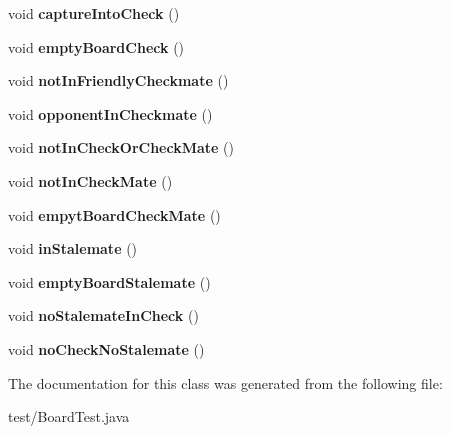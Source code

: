 \begin{DoxyCompactItemize}
\item 
\hypertarget{classtest_1_1BoardTest_aac0671a1d28175f82fe7ebd8a7834ec2}{void {\bfseries capture\-Into\-Check} ()}\label{classtest_1_1BoardTest_aac0671a1d28175f82fe7ebd8a7834ec2}

\item 
\hypertarget{classtest_1_1BoardTest_ab854addb0a5a79e2a1521f0b4e39ac0c}{void {\bfseries empty\-Board\-Check} ()}\label{classtest_1_1BoardTest_ab854addb0a5a79e2a1521f0b4e39ac0c}

\item 
\hypertarget{classtest_1_1BoardTest_a2de7c677b39c58e7670b959688da9e3b}{void {\bfseries not\-In\-Friendly\-Checkmate} ()}\label{classtest_1_1BoardTest_a2de7c677b39c58e7670b959688da9e3b}

\item 
\hypertarget{classtest_1_1BoardTest_a2cdf01a22f538f77cd4b9cfa43e4afa6}{void {\bfseries opponent\-In\-Checkmate} ()}\label{classtest_1_1BoardTest_a2cdf01a22f538f77cd4b9cfa43e4afa6}

\item 
\hypertarget{classtest_1_1BoardTest_a484ad2fd7123bdf6a35b9bd63821a13d}{void {\bfseries not\-In\-Check\-Or\-Check\-Mate} ()}\label{classtest_1_1BoardTest_a484ad2fd7123bdf6a35b9bd63821a13d}

\item 
\hypertarget{classtest_1_1BoardTest_aaab5644302b3794b87cf897f21fd1915}{void {\bfseries not\-In\-Check\-Mate} ()}\label{classtest_1_1BoardTest_aaab5644302b3794b87cf897f21fd1915}

\item 
\hypertarget{classtest_1_1BoardTest_acd4d2afb62f5255537b55a0ec2f8eb5d}{void {\bfseries empyt\-Board\-Check\-Mate} ()}\label{classtest_1_1BoardTest_acd4d2afb62f5255537b55a0ec2f8eb5d}

\item 
\hypertarget{classtest_1_1BoardTest_ab0f9ff6f618d19a64153d0096392eaef}{void {\bfseries in\-Stalemate} ()}\label{classtest_1_1BoardTest_ab0f9ff6f618d19a64153d0096392eaef}

\item 
\hypertarget{classtest_1_1BoardTest_af6aa06646303d5a37ec42d2c42e98a60}{void {\bfseries empty\-Board\-Stalemate} ()}\label{classtest_1_1BoardTest_af6aa06646303d5a37ec42d2c42e98a60}

\item 
\hypertarget{classtest_1_1BoardTest_a772af9b2ab858b438ae74e09a0ca7c19}{void {\bfseries no\-Stalemate\-In\-Check} ()}\label{classtest_1_1BoardTest_a772af9b2ab858b438ae74e09a0ca7c19}

\item 
\hypertarget{classtest_1_1BoardTest_af4b03eee98fdbf834d2624292bc0b6bf}{void {\bfseries no\-Check\-No\-Stalemate} ()}\label{classtest_1_1BoardTest_af4b03eee98fdbf834d2624292bc0b6bf}

\end{DoxyCompactItemize}


The documentation for this class was generated from the following file\-:\begin{DoxyCompactItemize}
\item 
test/Board\-Test.\-java\end{DoxyCompactItemize}
